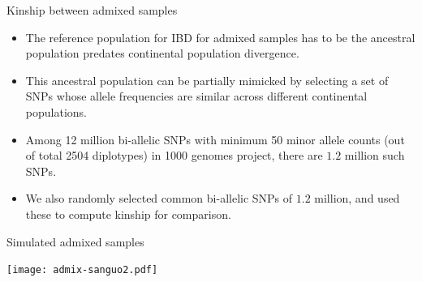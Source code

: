 \documentclass[]{beamer}
\begin{document}

\begin{frame}{Kinship between admixed samples}
\begin{itemize}
\item The reference population for IBD for admixed samples has to be the ancestral population predates continental population divergence. 
\item This ancestral population can be partially mimicked by selecting a set of SNPs  whose allele frequencies are similar across different continental populations. 
\item Among 12 million bi-allelic SNPs with minimum 50 minor allele counts (out of total 2504 diplotypes) in 1000 genomes project, there are $1.2$ million such SNPs.  
\item We also randomly selected common bi-allelic SNPs of $1.2$ million,  and used these to compute kinship for comparison. 
\end{itemize}
\end{frame}

\begin{frame}{Simulated admixed samples}
\begin{center}
\texttt{[image: admix-sanguo2.pdf]}
\end{center}
\end{frame}
\end{document}
